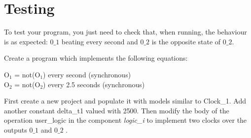 \section{Testing}

To test your program, you just need to check that, when running, the behaviour is as expected: $0\_1$ beating every second and $0\_2$  is the opposite state of $0\_2$.

\begin{exercise}
Create a program which implements the following equations:
\begin{center}
O$_1$ = not(O$_1$) every second (synchronous)\\
O$_2$ = not(O$_2$) every 2.5 seconds (synchronous)  
\end{center}
First create a new project and populate it with models similar to Clock\_1. Add another constant delta\_t1 valued with 2500. Then modify the body of the operation user\_logic in the component \textit{logic\_i} to implement two clocks over the outputs $0\_1$ and $0\_2$ .
\end{exercise}
